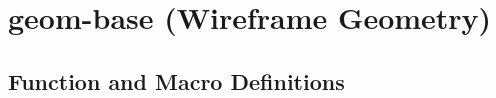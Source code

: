 \documentclass [11pt]{book}
\begin{document}
\label{sec:genworks-gdl(genworks®gdl)}







\section{geom-base (Wireframe Geometry)}

\label{sec:geom-base(wireframegeometry)}





\subsection{Function and Macro Definitions}
\end{document}
